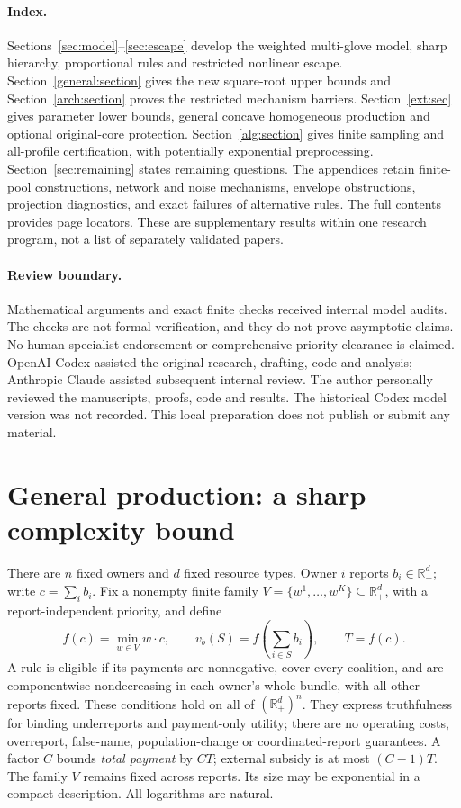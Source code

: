 \documentclass[11pt]{article}
\theoremstyle{definition}\newtheorem{definition}[theorem]{Definition}
\theoremstyle{remark}\newtheorem{remark}[theorem]{Remark}
\newcommand{\R}{\mathbb R}
\begin{document}
\paragraph{Index.}
Sections~\ref{sec:model}--\ref{sec:escape} develop the weighted multi-glove
model, sharp hierarchy, proportional rules and restricted nonlinear escape.
Section~\ref{general:section} gives the new square-root upper bounds and
Section~\ref{arch:section} proves the restricted mechanism barriers.
Section~\ref{ext:sec} gives parameter lower bounds, general
concave homogeneous production and optional original-core protection.
Section~\ref{alg:section} gives finite sampling and all-profile certification,
with potentially exponential preprocessing. Section~\ref{sec:remaining}
states remaining questions. The appendices retain finite-pool constructions,
network and noise mechanisms, envelope obstructions, projection diagnostics,
and exact failures of alternative rules. The full contents provides page
locators. These are supplementary results within one research program,
not a list of separately validated papers.

\paragraph{Review boundary.}
Mathematical arguments and exact finite checks received internal model audits.
The checks are not formal verification, and they do not prove asymptotic
claims. No human specialist endorsement or comprehensive priority clearance
is claimed. OpenAI Codex assisted the original research, drafting, code and
analysis; Anthropic Claude assisted subsequent internal review. The author
personally reviewed the manuscripts, proofs, code and results. The historical
Codex model version was not recorded. This local preparation does not publish
or submit any material.
\tableofcontents
\clearpage
\section{General production: a sharp complexity bound}\label{prod:section}
There are $n$ fixed owners and $d$ fixed resource types. Owner $i$ reports
$b_i\in\R_+^d$; write $c=\sum_i b_i$. Fix a nonempty finite family
$V=\{w^1,\ldots,w^K\}\subseteq\R_+^d$, with a report-independent priority,
and define
\[
 f(c)=\min_{w\in V}w\cdot c,\qquad
 v_b(S)=f\left(\sum_{i\in S}b_i\right),\qquad T=f(c).
\]
A rule is eligible if its payments are nonnegative, cover every coalition,
and are componentwise nondecreasing in each owner's whole bundle, with all
other reports fixed. These conditions hold on all of $(\R_+^d)^n$.
They express truthfulness for binding underreports and payment-only utility;
there are no operating costs, overreport, false-name, population-change or
coordinated-report guarantees. A factor $C$ bounds \emph{total payment} by
$CT$; external subsidy is at most $(C-1)T$. The family $V$ remains fixed
across reports. Its size may be exponential in a compact description. All logarithms are natural.
\end{document}
